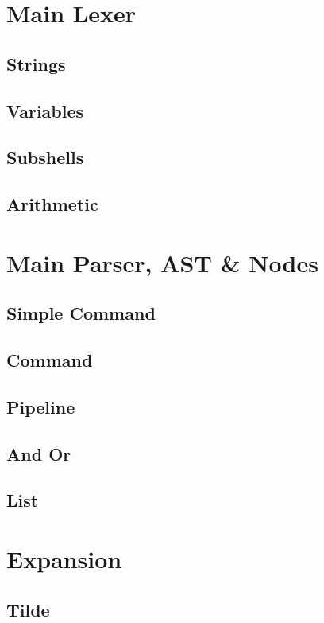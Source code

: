 \section{Main Lexer}

\subsection{Strings}
\subsection{Variables}
\subsection{Subshells}
\subsection{Arithmetic}
\label{sec:main-lexer-arith}

\section{Main Parser, AST \& Nodes}

\subsection{Simple Command}
\subsection{Command}
\subsection{Pipeline}
\subsection{And Or}
\subsection{List}

\section{Expansion}

\subsection{Tilde}

